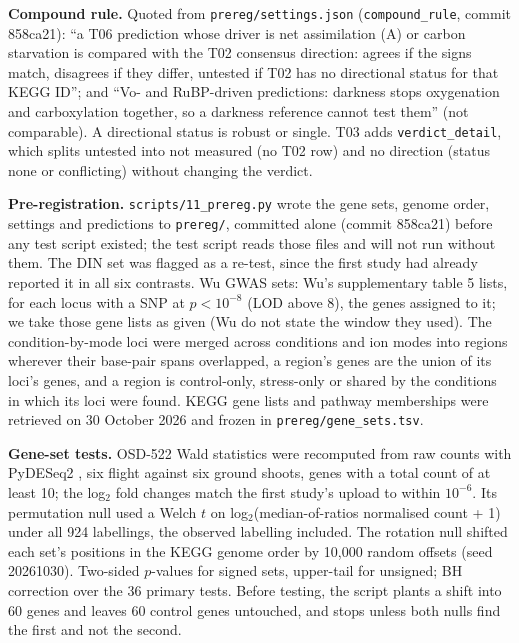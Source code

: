 \documentclass{npjlayout}
\begin{document}
\textbf{Compound rule.} Quoted from \texttt{prereg/settings.json} (\texttt{compound\_rule}, commit
858ca21): ``a T06 prediction whose driver is net assimilation (A) or carbon starvation is compared
with the T02 consensus direction: agrees if the signs match, disagrees if they differ, untested if
T02 has no directional status for that KEGG ID''; and ``Vo- and RuBP-driven predictions: darkness
stops oxygenation and carboxylation together, so a darkness reference cannot test them'' (not
comparable). A directional status is robust or single. T03 adds \texttt{verdict\_detail}, which
splits untested into not measured (no T02 row) and no direction (status none or conflicting)
without changing the verdict.

\textbf{Pre-registration.} \texttt{scripts/11\_prereg.py} wrote the gene sets, genome order,
settings and predictions to \texttt{prereg/}, committed alone (commit 858ca21) before any test script
existed; the test script reads those files and will not run without them. The DIN set was flagged as
a re-test, since the first study had already reported it in all six contrasts. Wu GWAS sets: Wu's
supplementary table 5 lists, for each locus with a SNP at $p<10^{-8}$ (LOD above 8), the genes
assigned to it; we take those gene lists as given (Wu do not state the window they used). The
\nWuLoci{} condition-by-mode loci were merged across conditions and ion modes into \nWuRegions{}
regions wherever their base-pair spans overlapped, a region's genes are the union of its loci's
genes, and a region is control-only, stress-only or shared by the conditions in which its loci were
found. KEGG gene lists and pathway memberships were retrieved on 30 October 2026 and frozen in
\texttt{prereg/gene\_sets.tsv}.

\textbf{Gene-set tests.} OSD-522 Wald statistics were recomputed from raw counts with PyDESeq2
\citep{pydeseq2,love2014}, six flight against six ground shoots, genes with a total count of at
least 10; the log$_2$ fold changes match the first study's upload to within $10^{-6}$. Its
permutation null used a Welch $t$ on log$_2$(median-of-ratios normalised count + 1) under all 924
labellings, the observed labelling included. The rotation null shifted each set's positions in the
KEGG genome order by 10{,}000 random offsets (seed 20261030). Two-sided $p$-values for signed sets,
upper-tail for unsigned; BH correction over the 36 primary tests. Before testing, the script plants
a shift into 60 genes and leaves 60 control genes untouched, and stops unless both nulls find the
first and not the second.
\end{document}
